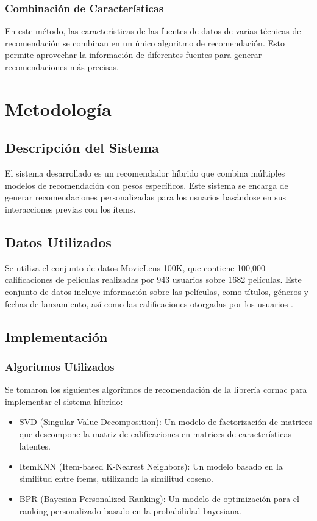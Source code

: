 \documentclass[a4paper,12pt]{report}
\begin{document}
        \subsection{Combinación de Características}
En este método, las características de las fuentes de datos de varias técnicas de recomendación se combinan en un único algoritmo de recomendación. Esto permite aprovechar la información de diferentes fuentes para generar recomendaciones más precisas.
\chapter{Metodología}
\section{Descripción del Sistema}
El sistema desarrollado es un recomendador híbrido que combina múltiples modelos de recomendación con pesos específicos. Este sistema se encarga de generar recomendaciones personalizadas para los usuarios basándose en sus interacciones previas con los ítems.

\section{Datos Utilizados}
Se utiliza el conjunto de datos MovieLens 100K, que contiene 100,000 calificaciones de películas realizadas por 943 usuarios sobre 1682 películas. Este conjunto de datos incluye información sobre las películas, como títulos, géneros y fechas de lanzamiento, así como las calificaciones otorgadas por los usuarios \cite{movielens}.

\section{Implementación}
\subsection{Algoritmos Utilizados}
Se tomaron los siguientes algoritmos de recomendación de la librería cornac \cite{cornac} para implementar el sistema híbrido:
\begin{itemize}
    \item SVD (Singular Value Decomposition): Un modelo de factorización de matrices que descompone la matriz de calificaciones en matrices de características latentes.
    \item ItemKNN (Item-based K-Nearest Neighbors): Un modelo basado en la similitud entre ítems, utilizando la similitud coseno.
    \item BPR (Bayesian Personalized Ranking): Un modelo de optimización para el ranking personalizado basado en la probabilidad bayesiana.
\end{itemize}
\end{document}
